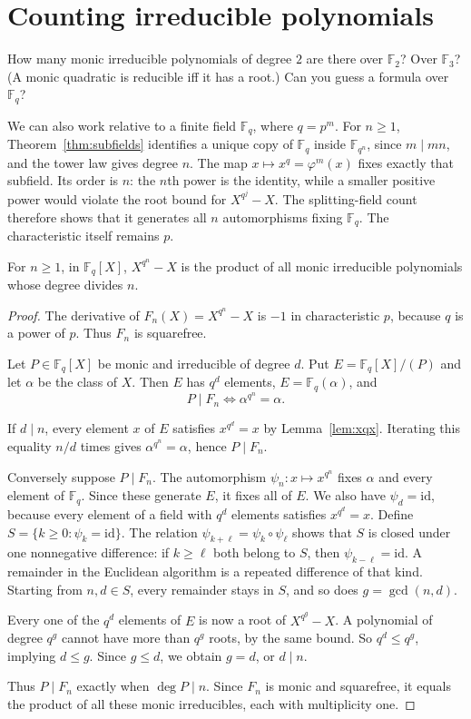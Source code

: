 \section{Counting irreducible polynomials}

\begin{think}
How many monic irreducible polynomials of degree $2$ are there over $\mathbb F_2$? Over $\mathbb F_3$? (A monic quadratic is reducible iff it has a root.) Can you guess a formula over $\mathbb F_q$?
\end{think}

We can also work relative to a finite field $\mathbb F_q$, where $q=p^m$.
For $n\ge1$, Theorem~\ref{thm:subfields} identifies a unique copy of
$\mathbb F_q$ inside $\mathbb F_{q^n}$, since $m\mid mn$, and the tower
law gives degree $n$. The map $x\mapsto x^q=\varphi^m(x)$ fixes exactly
that subfield. Its order is $n$: the $n$th power is the identity, while
a smaller positive power would violate the root bound for $X^{q^j}-X$.
The splitting-field count therefore shows that it generates all $n$
automorphisms fixing $\mathbb F_q$. The characteristic itself remains $p$.

\begin{theorem}\label{thm:xqnx}
For $n\ge1$, in $\mathbb F_q[X]$, $X^{q^n}-X$ is the product of all monic irreducible polynomials whose degree divides $n$.
\end{theorem}
\begin{proof}
The derivative of $F_n(X)=X^{q^n}-X$ is $-1$
in characteristic $p$, because $q$ is a power of $p$.
Thus $F_n$ is squarefree.

Let $P\in\mathbb F_q[X]$ be monic and irreducible
of degree $d$. Put $E=\mathbb F_q[X]/(P)$ and let
$\alpha$ be the class of $X$. Then $E$ has $q^d$
elements, $E=\mathbb F_q(\alpha)$, and
\[
P\mid F_n\iff \alpha^{q^n}=\alpha.
\]

If $d\mid n$, every element $x$ of $E$ satisfies
$x^{q^d}=x$ by Lemma~\ref{lem:xqx}.
Iterating this equality $n/d$ times gives
$\alpha^{q^n}=\alpha$, hence $P\mid F_n$.

Conversely suppose $P\mid F_n$.
The automorphism $\psi_n:x\mapsto x^{q^n}$
fixes $\alpha$ and every element of $\mathbb F_q$.
Since these generate $E$, it fixes all of $E$.
We also have $\psi_d=\mathrm{id}$, because every element of a field with $q^d$ elements satisfies $x^{q^d}=x$.
Define $S=\{k\ge0:\psi_k=\mathrm{id}\}$.
The relation $\psi_{k+\ell}=\psi_k\circ\psi_\ell$
shows that $S$ is closed under one nonnegative difference:
if $k\ge\ell$ both belong to $S$, then $\psi_{k-\ell}=\mathrm{id}$.
A remainder in the Euclidean algorithm is a repeated difference of that kind. Starting from $n,d\in S$, every remainder stays in $S$, and so does $g=\gcd(n,d)$.

Every one of the $q^d$ elements of $E$ is now
a root of $X^{q^g}-X$. A polynomial of degree
$q^g$ cannot have more than $q^g$ roots, by the same bound.
So $q^d\le q^g$, implying $d\le g$.
Since $g\le d$, we obtain $g=d$, or $d\mid n$.

Thus $P\mid F_n$ exactly when $\deg P\mid n$.
Since $F_n$ is monic and squarefree, it equals
the product of all these monic irreducibles,
each with multiplicity one.
\end{proof}


